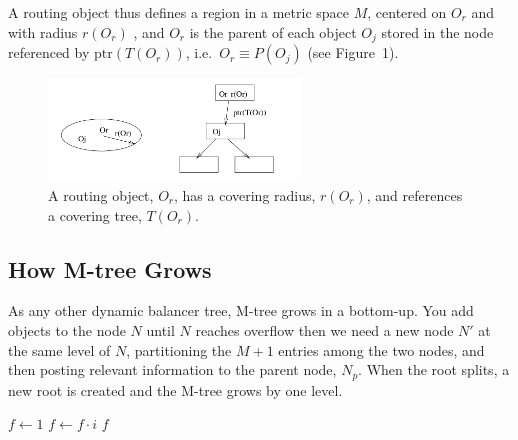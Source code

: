 \documentclass{article}
\begin{document}
A routing object thus defines a region in a metric space \( M \), centered on \( O_r \) and with radius \(r(O_r)\) , and \(O_r\) is the parent of each object \(O_j\) stored in the node referenced by  \(\text{ptr}(T(O_r))\), i.e.\ \( O_r \equiv P(O_j) \) (see Figure~1).

	\begin{figure}[H]
		\centering
		\includegraphics[width=0.6\textwidth]{../img/im1.png}
		\caption{A routing object, \( O_r \), has a covering radius, \( r(O_r) \), and references a covering tree, \( T(O_r) \).}
		\label{fig:routing_object}
	\end{figure}

	\subsection{How M-tree Grows}
	As any other dynamic balancer tree, M-tree grows in a bottom-up. You add objects to the node \(N\) until \(N\) reaches overflow then we need a new node \(N'\) at the same level of \(N\), partitioning the \(M+1\) entries among the two nodes, and then posting relevant information to the parent node, \(N_p\).
	When the root splits, a new root is created and the M-tree grows by one level.
	
		
		\begin{algorithm}
			\caption{\(\text{M-tree split}\)}
			\begin{algorithmic}[1]
				\State $f \gets 1$
				\State $f \gets f \cdot i$
				\EndFor
				\State \Return $f$
				\EndProcedure
			\end{algorithmic}
		\end{algorithm}
\end{document}
